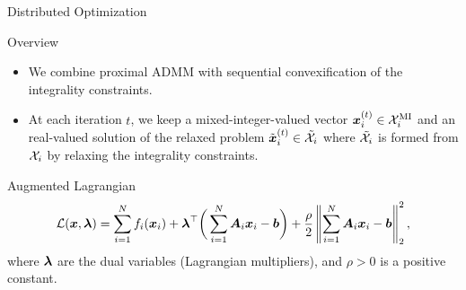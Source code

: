 \documentclass[9pt]{beamer}
\begin{document}
\begin{frame}{Distributed Optimization}

\begin{block}{Overview}
\begin{itemize}
\item We combine proximal ADMM with sequential convexification of the integrality constraints.
\item At each iteration $t$, we keep a mixed-integer-valued vector $\boldsymbol{x}_i^{(t)} \in \mathcal{X}_i^{\rm{MI}}$ and an real-valued solution of the relaxed problem $\tilde{\boldsymbol{x}}_i^{(t)} \in \tilde{\mathcal{X}}_i$ where $\tilde{\mathcal{X}}_i$ is formed from $\mathcal{X}_i$ by relaxing the integrality constraints.
\end{itemize}
\end{block}

\begin{block}{Augmented Lagrangian}
\begin{equation}
\mathcal{L} (\boldsymbol{x}, \boldsymbol{\lambda}) = \sum_{i=1}^{N} f_i ( \boldsymbol{x}_i) + \boldsymbol{\lambda}^\top \bigg(\sum_{i=1}^{N} \boldsymbol{A}_{i} \boldsymbol{x}_i - \boldsymbol{b} \bigg) 
+ \frac{\rho}{2} \left\lVert \sum_{i=1}^{N} \boldsymbol{A}_{i} \boldsymbol{x}_i - \boldsymbol{b} \right\rVert_2^2,
\end{equation}
where $\boldsymbol{\lambda}$ are the dual variables (Lagrangian multipliers), and $\rho > 0$ is a positive constant.
\end{block}

\end{frame}
\end{document}

